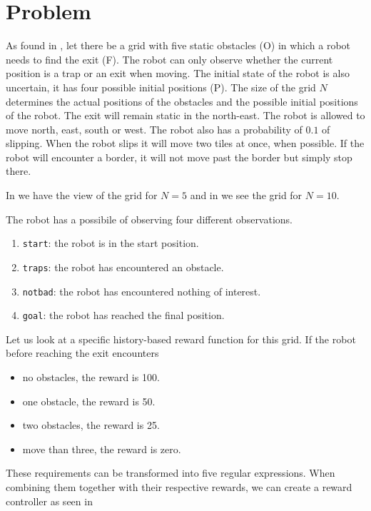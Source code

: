 \section{Problem}

As found in \cite{g:gridworld}, let there be a grid with five static obstacles (O) in which a robot needs to find the exit (F). The robot can only observe whether the current position is a trap or an exit when moving. The initial state of the robot is also uncertain, it has four possible initial positions (P). The size of the grid $N$ determines the actual positions of the obstacles and the possible initial positions of the robot. The exit will remain static in the north-east. The robot is allowed to move north, east, south or west. The robot also has a probability of $0.1$ of slipping. When the robot slips it will move two tiles at once, when possible. If the robot will encounter a border, it will not move past the border but simply stop there.

In  we have the view of the grid for $N=5$ and in  we see the grid for $N=10$.



The robot has a possibile of observing four different observations.
\begin{enumerate}
\item \texttt{start}: the robot is in the start position.
\item \texttt{traps}: the robot has encountered an obstacle.
\item \texttt{notbad}: the robot has encountered nothing of interest.
\item \texttt{goal}: the robot has reached the final position.
\end{enumerate} 

Let us look at a specific history-based reward function for this grid. If the robot before reaching the exit encounters
\begin{itemize}
\item no obstacles, the reward is 100.
\item one obstacle, the reward is 50.
\item two obstacles, the reward is 25.
\item move than three, the reward is zero.
\end{itemize}

These requirements can be transformed into five regular expressions. When combining them together with their respective rewards, we can create a reward controller as seen in 

